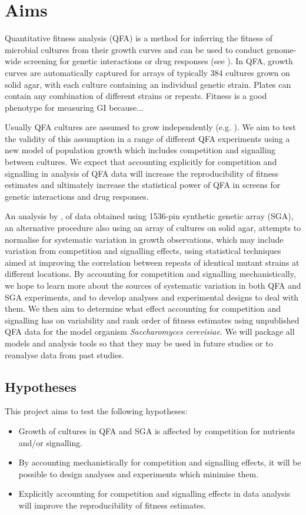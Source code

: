 
\section{Aims}
\label{sec:aims}
Quantitative fitness analysis (QFA) is a method for inferring the
fitness of microbial cultures from their growth curves and can be used
to conduct genome-wide screening for genetic interactions or drug
responses (see
\citet{Addinall2008,Addinall2011,Lawless2010,Banks2012,Andrew2013}). In
QFA, growth curves are automatically captured for arrays of typically
384 cultures grown on solid agar, with each culture containing an
individual genetic strain. Plates can contain any combination of
different strains or repeats. Fitness is a good phenotype for
measuring GI because...

Usually QFA cultures are assumed to grow independently
(e.g. \citet{Addinall2011}). We aim to test the validity of this
assumption in a range of different QFA experiments using a new model
of population growth which includes competition and signalling between
cultures. We expect that accounting explicitly for competition and
signalling in analysis of QFA data will increase the reproducibility
of fitness estimates and ultimately increase the statistical power of
QFA in screens for genetic interactions and drug responses.

An analysis by \citet{Baryshnikova2010}, of data obtained using
1536-pin synthetic genetic array (SGA), an alternative procedure also
using an array of cultures on solid agar, attempts to normalise for
systematic variation in growth observations, which may include
variation from competition and signalling effects, using statistical
techniques aimed at improving the correlation between repeats of
identical mutant strains at different locations. By accounting for
competition and signalling mechanistically, we hope to learn more
about the sources of systematic variation in both QFA and SGA
experiments, and to develop analyses and experimental designs to deal
with them. We then aim to determine what effect accounting for
competition and signalling has on variability and rank order of
fitness estimates using unpublished QFA data for the model organism
\textit{Saccharomyces cerevisiae}. We will package all models and
analysis tools so that they may be used in future studies or to
reanalyse data from past studies.

\subsection{Hypotheses}
This project aims to test the following hypotheses:
\begin{itemize}
\item Growth of cultures in QFA and SGA is affected by competition for
  nutrients and/or signalling.
\item By accounting mechanistically for competition and signalling
  effects, it will be possible to design analyses and experiments
  which minimise them.
\item Explicitly accounting for competition and signalling effects in
  data analysis will improve the reproducibility of fitness estimates.
\end{itemize}

